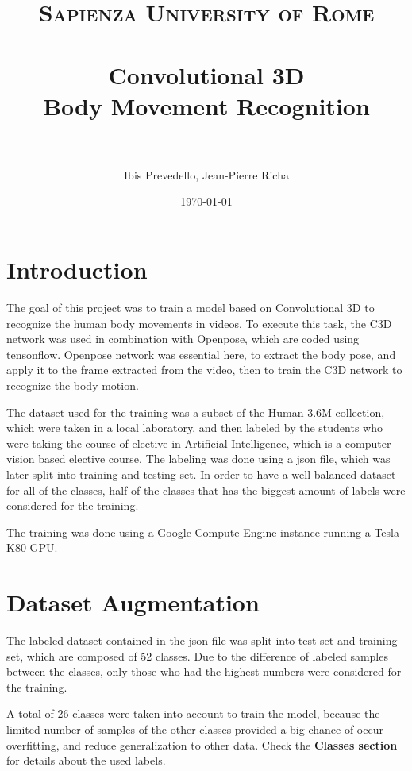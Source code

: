 \documentclass{article}
\title{
\normalfont \normalsize
\textsc{Sapienza University of Rome} \\ [25pt] %
\horrule{0.5pt} \\[0.4cm] %
\LARGE Convolutional 3D \\ %
\large Body Movement Recognition \\
\horrule{2pt} \\[0.5cm] %
}
\author{Ibis Prevedello, Jean-Pierre Richa} %
\date{\normalsize\today} %
\begin{document}
\sloppy %

\maketitle %



\section{Introduction}

The goal of this project was to train a model based on Convolutional 3D to recognize the human body movements in videos. To execute this task, the C3D network was used in combination with Openpose, which are coded using tensonflow. Openpose network was essential here, to extract the body pose, and apply it to the frame extracted from the video, then to train the C3D network to recognize the body motion. 

The dataset used for the training was a subset of the Human 3.6M collection, which were taken in a local laboratory, and then labeled by the students who were taking the course of elective in Artificial Intelligence, which is a computer vision based elective course. The labeling was done using a json file, which was later split into training and testing set. In order to have a well balanced dataset for all of the classes, half of the classes that has the biggest amount of labels were considered for the training. 

The training was done using a Google Compute Engine instance running a Tesla K80 GPU.



\section{Dataset Augmentation}

The labeled dataset contained in the json file was split into test set and training set, which are composed of 52 classes. Due to the difference of labeled samples between the classes, only those who had the highest numbers were considered for the training. 

A total of 26 classes were taken into account to train the model, because the limited number of samples of the other classes provided a big chance of occur overfitting, and reduce generalization to other data. Check the \textbf{Classes section} for details about the used labels.\newline
\end{document}
